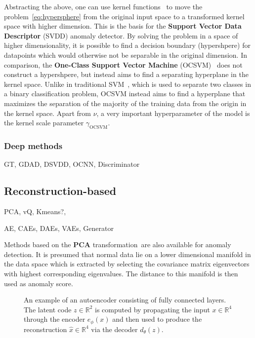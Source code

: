 Abstracting the above, one can use kernel functions~\cite{shawe2004kernel} to move the problem~\eqref{eq:hypersphere} from the original input space to a transformed kernel space with higher dimension. This is the basis for the \textbf{Support Vector Data Descriptor} (SVDD) anomaly detector. By solving the problem in a space of higher dimensionality, it is possible to find a decision boundary (hypershpere) for datapoints which would otherwise not be separable in the original dimension. In comparison, the \textbf{One-Class Support Vector Machine} (OCSVM)~\cite{scholkopf2001estimating} does not construct a hypershpere, but instead aims to find a separating hyperplane in the kernel space. Unlike in traditional SVM~\cite{cortes1995support}, which is used to separate two classes in a binary classification problem, OCSVM instead aims to find a hyperplane that maximizes the separation of the majority of the training data from the origin in the kernel space. Apart from $\nu$, a very important hyperparameter of the model is the kernel scale parameter $\gamma_{\text{OCSVM}}$.

\subsubsection{Deep methods}

GT, GDAD, DSVDD, OCNN, Discriminator


\subsection{Reconstruction-based}

PCA, vQ, Kmeans?, 

AE, CAEs, DAEs, VAEs, Generator

Methods based on the \textbf{PCA }transformation\,\cite{shyu2003novel,aggarwal2015outlier}\textbf{
}are also available for anomaly detection. It is presumed that normal
data lie on a lower dimensional manifold in the data space which is
extracted by selecting the covariance matrix eigenvectors with highest
corresponding eigenvalues. The distance to this manifold is then used
as anomaly score.


\begin{figure}
\begin{centering}

\par\end{centering}
\centering{}\caption{An example of an autoencoder consisting of fully connected layers.
The latent code $z\in\mathbb{R}^{2}$ is computed by propagating the
input $x\in\mathbb{R}^{4}$ through the encoder $e_{\phi}(x)$ and
then used to produce the reconstruction $\hat{x}\in\mathbb{R}^{4}$
via the decoder $d_{\theta}(z)$.}
\label{fig:ae}
\end{figure}

